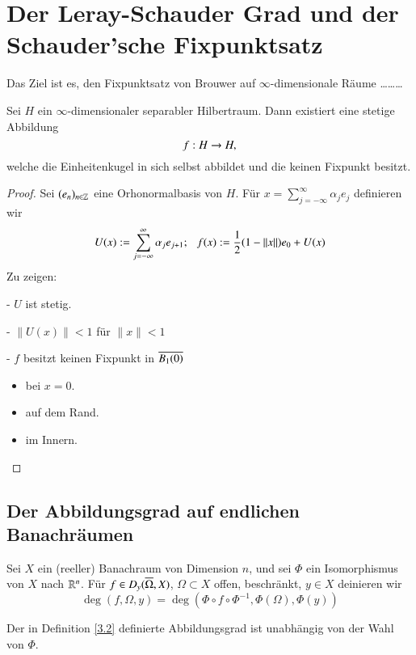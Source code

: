 \section{Der Leray-Schauder Grad und der Schauder'sche Fixpunktsatz}

Das Ziel ist es, den Fixpunktsatz von Brouwer auf $\infty$-dimensionale Räume ………

\begin{theorem}[Kakutani]\label{3.1}
    Sei $H$ ein $\infty$-dimensionaler separabler Hilbertraum. Dann existiert eine stetige Abbildung
    \[
        f:H\rightarrow H,
    \]
    welche die Einheitenkugel in sich selbst abbildet und die keinen Fixpunkt besitzt.
\end{theorem}

\begin{proof}
    Sei $(e_n)_{n\in \mathbb{Z}}$ eine Orhonormalbasis von $H$. Für $x=\sum_{j=-\infty}^\infty\alpha_je_j$
    definieren wir
    \[
        U(x):=\sum_{j=-\infty}^\infty \alpha _je_{j+1};\hspace{.25cm} f(x):=\frac12 (1-\|x\|)e_0+U(x)
    \]
    Zu zeigen:
    \begin{description}
    \item{-}
    $U$ ist stetig.
    \item{-}
    $\|U(x)\|<1$ für $\|x\|<1$
    \item{-}
    $f$ besitzt keinen Fixpunkt in $\overline{B_1(0)}$
    \begin{itemize}
        \item bei $x=0$.
        \item auf dem Rand.
        \item im Innern.
    \end{itemize}
    \end{description}
    \[  \]
\end{proof}

\subsection{Der Abbildungsgrad auf endlichen Banachräumen}

\begin{defi}\label{3.2}
    Sei $X$ ein (reeller) Banachraum von Dimension $n$, und sei $\Phi$ ein Isomorphismus von $X$ nach 
    $\mathbb{R}^n$. Für $f\in D_y(\overline \Omega,X)$, $\Omega \subset X$ offen, beschränkt, $y\in X$ deinieren wir
    \[
        \deg(f,\Omega,y)=\deg(\Phi\circ f \circ \Phi^{-1},\Phi(\Omega),\Phi(y))
    \]
\end{defi}

\begin{prop}\label{3.3}
    Der in Definition \ref{3.2} definierte Abbildungsgrad ist unabhängig von der Wahl von $\Phi$.
\end{prop}

